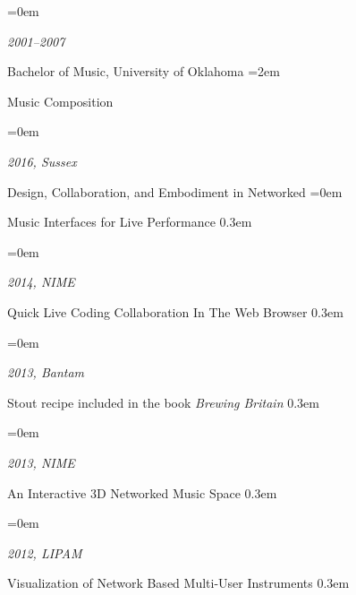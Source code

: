 \documentclass{scrartcl}
\newlength{\datebox}\settowidth{\datebox}{2011--Present} %
\newcommand{\NewEntry}[3]{\noindent\hangindent=0em\hangafter=0 \parbox{\datebox}{\small \textit{#1}} #2 #3 %
} %
\newcommand{\Description}[1]{\hangindent=2em\hangafter=0\noindent\raggedright\footnotesize{#1}\par\normalsize\vspace{1em}} %
\begin{document}
\begin{cv}{}

\NewEntry{2001--2007}{Bachelor of Music, University of Oklahoma}

\Description{Music Composition}



\vspace{0.5em} %


\vspace{1em}

\NewEntry{2016, Sussex}{\small{Design, Collaboration, and Embodiment in Networked}}
\NewEntry{}{\small{Music Interfaces for Live Performance}}
\vspace{0.3em}

\NewEntry{2014, NIME}{\small{Quick Live Coding Collaboration In The Web Browser}}
\vspace{0.3em}

\NewEntry{2013, Bantam}{\small{Stout recipe included in the book \emph{Brewing Britain}}}
\vspace{0.3em}

\NewEntry{2013, NIME}{\small{An Interactive 3D Networked Music Space}}
\vspace{0.3em}

\NewEntry{2012, LIPAM}{\small{Visualization of Network Based Multi-User Instruments}}
\vspace{0.3em}


\end{cv}
\end{document}
